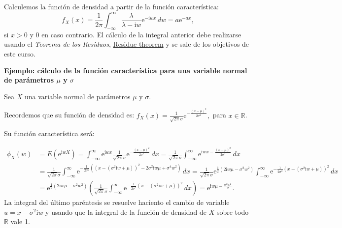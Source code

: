 \documentclass[]{book}
\begin{document}
Calculemos la función de densidad a partir de la función característica:
\[
f_X(x)=\frac{1}{2\pi}\int_{-\infty}^\infty \frac{\lambda}{\lambda -\mathrm{i} w}\mathrm{e}^{-\mathrm{i}wx}\, dw = a\mathrm{e}^{-a x},
\]
si \(x>0\) y \(0\) en caso contrario. El cálculo de la integral anterior debe realizarse usando el \emph{Teorema de los Residuos}, \href{https://en.wikipedia.org/wiki/Residue_theorem}{Residue theorem} y se sale de los objetivos de este curso.

\textbf{Ejemplo: cálculo de la función característica para una variable normal de parámetros \(\mu\) y \(\sigma\)}

Sea \(X\) una variable normal de parámetros \(\mu\) y \(\sigma\).

Recordemos que su función de densidad es: \(f_X(x)=\frac{1}{\sqrt{2\pi}\sigma}\mathrm{e}^{-\frac{(x-\mu)^2}{2\sigma^2}},\) para \(x\in \mathbb{R}\).

Su función característica será:

\[
\begin{array}{rl}
\phi_X (w) & =\displaystyle E\left(\mathrm{e}^{\mathrm{i}w X}\right)=\int_{-\infty}^\infty \mathrm{e}^{\mathrm{i}w x}\frac{1}{\sqrt{2\pi}\sigma}\mathrm{e}^{-\frac{(x-\mu)^2}{2\sigma^2}}\, dx = \frac{1}{\sqrt{2\pi}\sigma} \int_{-\infty}^\infty \mathrm{e}^{\mathrm{i}wx-\frac{(x-\mu)^2}{2\sigma^2}}\, dx \\[1ex]  & =\displaystyle  \frac{1}{\sqrt{2\pi}\sigma} \int_{-\infty}^\infty \mathrm{e}^{-\frac{1}{2\sigma^2}\left((x-(\sigma^2 \mathrm{i}w+\mu))^2-2\sigma^2 \mathrm{i}w \mu+\sigma^4 w^2\right)}\, dx = \frac{1}{\sqrt{2\pi}\sigma} \mathrm{e}^{\frac{1}{2}(2 \mathrm{i}w \mu -\sigma^2 w^2)}\int_{-\infty}^\infty \mathrm{e}^{-\frac{1}{2\sigma^2}(x-(\sigma^2 \mathrm{i}w+\mu))^2}\, dx\\[1ex] &  = \displaystyle\mathrm{e}^{\frac{1}{2}(2 \mathrm{i}w \mu -\sigma^2 w^2)} \left( \frac{1}{\sqrt{2\pi}\sigma} \int_{-\infty}^\infty \mathrm{e}^{-\frac{1}{2\sigma^2}(x-(\sigma^2 \mathrm{i}w+\mu))^2}\, dx\right) =  \mathrm{e}^{ \mathrm{i}w \mu -\frac{\sigma^2 w^2}{2}}.
\end{array}
\]
La integral del último paréntesis se resuelve haciento el cambio de variable \(u=x-\sigma^2 \mathrm{i}w\) y usando que la integral de la función de densidad de \(X\) sobre todo \(\mathbb{R}\) vale 1.
\end{document}

